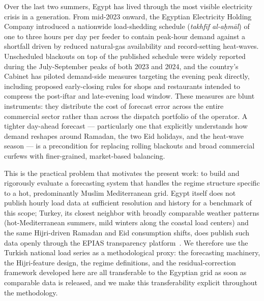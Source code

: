 \documentclass[10pt, a4paper, twocolumn]{article}
\begin{document}
Over the last two summers, Egypt has lived through the most
visible electricity crisis in a generation. From mid-2023 onward,
the Egyptian Electricity Holding Company introduced a nationwide
load-shedding schedule (\emph{takhf\=if al-a\d{h}m\=al}) of one to
three hours per day per feeder to contain peak-hour demand against
a shortfall driven by reduced natural-gas availability and
record-setting heat-waves. Unscheduled blackouts on top of the
published schedule were widely reported during the July-September
peaks of both 2023 and 2024, and the country's Cabinet has piloted
demand-side measures targeting the evening peak directly,
including proposed early-closing rules for shops and restaurants
intended to compress the post-iftar and late-evening load
window. These measures are blunt instruments: they distribute the
cost of forecast error across the entire commercial sector rather
than across the dispatch portfolio of the operator. A tighter
day-ahead forecast --- particularly one that explicitly understands
how demand reshapes around Ramadan, the two Eid holidays, and the
heat-wave season --- is a precondition for replacing rolling
blackouts and broad commercial curfews with finer-grained,
market-based balancing.

This is the practical problem that motivates the present work:
to build and rigorously evaluate a forecasting system that handles
the regime structure specific to a hot, predominantly Muslim
Mediterranean grid. Egypt itself does not publish hourly load data
at sufficient resolution and history for a benchmark of this
scope; Turkey, its closest neighbor with broadly comparable
weather patterns (hot-Mediterranean summers, mild winters along
the coastal load centers) and the same Hijri-driven Ramadan and
Eid consumption shifts, does publish such data openly through the
EPIAS transparency platform~\cite{epias}. We therefore use the
Turkish national load series as a methodological proxy: the
forecasting machinery, the Hijri-feature design, the regime
definitions, and the residual-correction framework developed here
are all transferable to the Egyptian grid as soon as comparable
data is released, and we make this transferability explicit
throughout the methodology.
\end{document}
